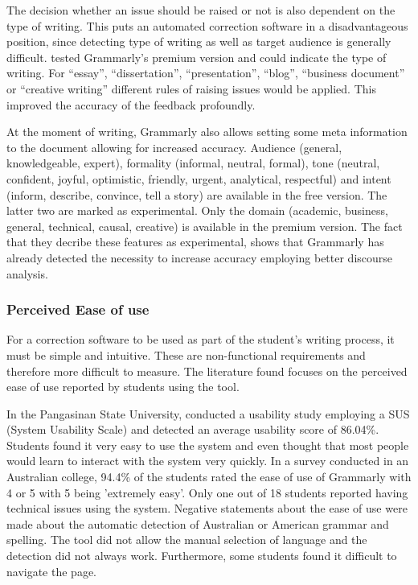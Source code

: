 \documentclass[runningheads]{llncs}
\let\OldTextregistered\textregistered
\renewcommand{\textregistered}{\OldTextregistered\xspace}%
\begin{document}
The decision whether an issue should be raised or not is also dependent on the type of writing. This puts an automated correction software in a disadvantageous position, since detecting type of writing as well as target audience is generally difficult. \textcite{cavaleri_you_2016} tested Grammarly\textregistered's premium version and could indicate the type of writing. For ``essay'', ``dissertation'', ``presentation'', ``blog'', ``business document'' or ``creative writing'' different rules of raising issues would be applied. This improved the accuracy of the feedback profoundly.

At the moment of writing, Grammarly\textregistered also allows setting some meta information to the document allowing for increased accuracy. Audience (general, knowledgeable, expert), formality (informal, neutral, formal), tone (neutral, confident, joyful, optimistic, friendly, urgent, analytical, respectful) and intent (inform, describe, convince, tell a story) are available in the free version. The latter two are marked as experimental. Only the domain (academic, business, general, technical, causal, creative) is available in the premium version. The fact that they decribe these features as experimental, shows that Grammarly\textregistered has already detected the necessity to increase accuracy employing better discourse analysis.

\subsubsection{Perceived Ease of use}
For a correction software to be used as part of the student's writing process, it must be simple and intuitive. These are non-functional requirements and therefore more difficult to measure. The literature found focuses on the perceived ease of use reported by students using the tool.

In the Pangasinan State University, \textcite{ventayen_graduate_2018} conducted a usability study employing a SUS (System Usability Scale) and detected an average usability score of 86.04\%. Students found it very easy to use the system and even thought that most people would learn to interact with the system very quickly. In a survey \citep{cavaleri_you_2016} conducted in an Australian college, 94.4\% of the students rated the ease of use of Grammarly\textregistered with 4 or 5 with 5 being 'extremely easy'. Only one out of 18 students reported having technical issues using the system. Negative statements about the ease of use were made about the automatic detection of Australian or American grammar and spelling. The tool did not allow the manual selection of language and the detection did not always work. Furthermore, some students found it difficult to navigate the page.
\end{document}
